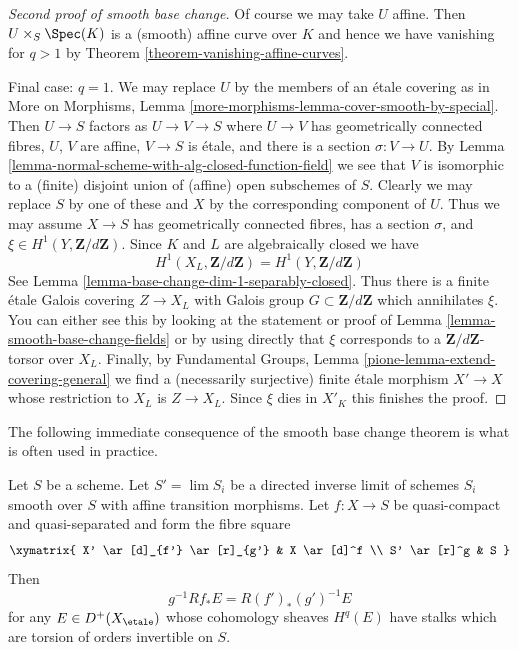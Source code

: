 \begin{proof}[Second proof of smooth base change]
\medskip\noindent
Of course we may take $U$ affine. Then $U \times_S \Spec(K)$
is a (smooth) affine curve over $K$ and hence we have vanishing
for $q > 1$ by Theorem \ref{theorem-vanishing-affine-curves}.

\medskip\noindent
Final case: $q = 1$. We may replace $U$ by the members of an
\'etale covering as in More on Morphisms, Lemma
\ref{more-morphisms-lemma-cover-smooth-by-special}.
Then $U \to S$ factors as $U \to V \to S$ where
$U \to V$ has geometrically connected fibres,
$U$, $V$ are affine, $V \to S$ is \'etale, and there is
a section $\sigma : V \to U$. By
Lemma \ref{lemma-normal-scheme-with-alg-closed-function-field}
we see that $V$ is isomorphic to a (finite) disjoint union of
(affine) open subschemes of $S$.
Clearly we may replace $S$ by one of these
and $X$ by the corresponding component of $U$.
Thus we may assume $X \to S$ has geometrically connected
fibres, has a section $\sigma$, and
$\xi \in H^1(Y, \mathbf{Z}/d\mathbf{Z})$.
Since $K$ and $L$ are algebraically closed we have
$$
H^1(X_L, \mathbf{Z}/d\mathbf{Z}) =
H^1(Y, \mathbf{Z}/d\mathbf{Z})
$$
See Lemma \ref{lemma-base-change-dim-1-separably-closed}.
Thus there is a finite \'etale Galois covering
$Z \to X_L$ with Galois group $G \subset \mathbf{Z}/d\mathbf{Z}$
which annihilates $\xi$.
You can either see this by looking at the statement or
proof of Lemma \ref{lemma-smooth-base-change-fields}
or by using directly that $\xi$ corresponds to a
$\mathbf{Z}/d\mathbf{Z}$-torsor over $X_L$.
Finally, by
Fundamental Groups, Lemma \ref{pione-lemma-extend-covering-general}
we find a (necessarily surjective)
finite \'etale morphism $X' \to X$
whose restriction to $X_L$ is $Z \to X_L$.
Since $\xi$ dies in $X'_K$ this finishes the proof.
\end{proof}

\noindent
The following immediate consequence of the smooth base change
theorem is what is often used in practice.

\begin{lemma}
\label{lemma-smooth-base-change-general}
Let $S$ be a scheme. Let $S' = \lim S_i$ be a directed inverse
limit of schemes $S_i$ smooth over $S$ with affine transition
morphisms. Let $f : X \to S$ be quasi-compact and quasi-separated
and form the fibre square
$$
\xymatrix{
X' \ar[d]_{f'} \ar[r]_{g'} & X \ar[d]^f \\
S' \ar[r]^g & S
}
$$
Then
$$
g^{-1}Rf_*E = R(f')_*(g')^{-1}E
$$
for any $E \in D^+(X_\etale)$ whose cohomology sheaves $H^q(E)$
have stalks which are torsion of orders invertible on $S$.
\end{lemma}

